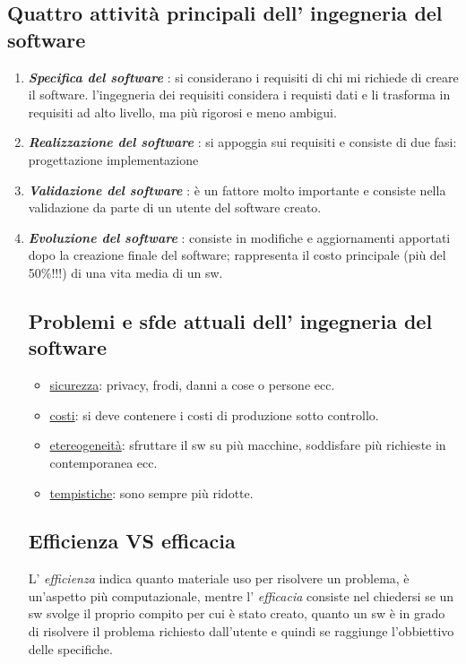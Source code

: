 \documentclass[a4paper, 10pt]{article}
\begin{document}
	\subsection*{Quattro attività principali dell' ingegneria del software}
	\begin{enumerate}
		\item \textbf{\textit{Specifica del software}} : si considerano i requisiti di chi mi richiede di
		creare il software.
		\subitem{-} l'ingegneria dei requisiti considera i requisti dati e li trasforma in
		requisiti ad alto livello, ma più rigorosi e meno ambigui.
		\item \textbf{\textit{Realizzazione del software}} : si appoggia sui requisiti e consiste di due fasi:
		\subitem{-} progettazione
		\subitem{-} implementazione
		\item \textbf{\textit{Validazione del software}} : è un fattore molto importante e consiste nella
		validazione da parte di un utente del software creato.
		\item \textbf{\textit{Evoluzione del software}} : consiste in modifiche e aggiornamenti apportati
		dopo la creazione finale del software; rappresenta il costo principale
		(più del 50\%!!!) di una vita media di un sw.
		
		\subsection*{Problemi e sfde attuali dell' ingegneria del software}
		
		\begin{itemize}
			\item \underline{sicurezza}: privacy, frodi, danni a cose o persone ecc.
			\item \underline{costi}: si deve contenere i costi di produzione sotto controllo.
			\item \underline{etereogeneità}: sfruttare il sw su più macchine, soddisfare più richieste in
			contemporanea ecc.
			\item \underline{tempistiche}: sono sempre più ridotte.
		\end{itemize}
		
		\subsection*{Efficienza VS efficacia}
		L' \textit{efficienza} indica quanto materiale uso per risolvere un problema, è un'aspetto più computazionale, mentre l' \textit{efficacia} consiste nel chiedersi se un sw svolge il proprio compito per cui è stato creato, quanto un sw è in grado di risolvere il problema richiesto dall'utente e quindi se raggiunge l'obbiettivo delle specifiche.
		

\end{enumerate}
\end{document}
